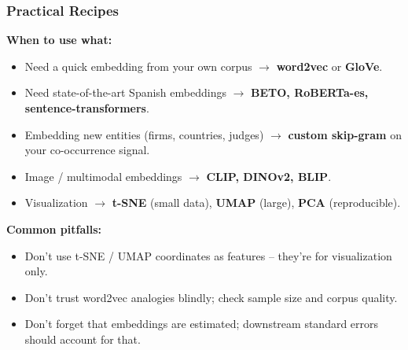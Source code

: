 \documentclass[notes,11pt, aspectratio=169]{beamer}
\begin{document}
\begin{frame}
\frametitle{Practical Recipes}

\textbf{When to use what:}
\begin{itemize}
    \item Need a quick embedding from your own corpus $\to$ \textbf{word2vec} or \textbf{GloVe}.
    \item Need state-of-the-art Spanish embeddings $\to$ \textbf{BETO, RoBERTa-es, sentence-transformers}.
    \item Embedding new entities (firms, countries, judges) $\to$ \textbf{custom skip-gram} on your co-occurrence signal.
    \item Image / multimodal embeddings $\to$ \textbf{CLIP, DINOv2, BLIP}.
    \item Visualization $\to$ \textbf{t-SNE} (small data), \textbf{UMAP} (large), \textbf{PCA} (reproducible).
\end{itemize}

\vspace{8pt}
\textbf{Common pitfalls:}
\begin{itemize}
    \item Don't use t-SNE / UMAP coordinates as features -- they're for visualization only.
    \item Don't trust word2vec analogies blindly; check sample size and corpus quality.
    \item Don't forget that embeddings are estimated; downstream standard errors should account for that.
\end{itemize}
\end{frame}
\end{document}
